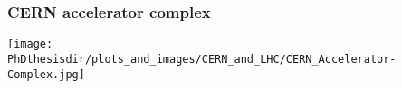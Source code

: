 \begin{frame}
\frametitle{CERN accelerator complex}
\begin{center}
\texttt{[image: \\PhDthesisdir/plots\_and\_images/CERN\_and\_LHC/CERN\_Accelerator-Complex.jpg]}
\end{center}
\end{frame}

